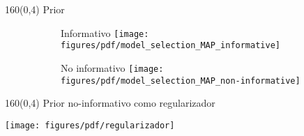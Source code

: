 \documentclass[shownotes,aspectratio=169]{beamer}
\begin{document}
% 
% 
% 
% 
% 
% 
% 
% 
% 
% 
% 
% 


\begin{frame}[plain]
\begin{textblock}{160}(0,4)
\centering \Large  Prior
\end{textblock}
\vspace{0.75cm}

       \begin{figure}[H]     
     \centering 
     \begin{subfigure}[b]{0.45\textwidth}
    \centering Informativo
    \texttt{[image: figures/pdf/model\_selection\_MAP\_informative]} 
     \end{subfigure}
       \begin{subfigure}[b]{0.45\textwidth}
     \centering 
     No informativo
    \texttt{[image: figures/pdf/model\_selection\_MAP\_non-informative]} 
   \end{subfigure}
\end{figure}

\end{frame}


\begin{frame}[plain]
\begin{textblock}{160}(0,4)
\centering \Large Prior no-informativo como regularizador
\end{textblock}
\vspace{0.75cm}

\centering
\texttt{[image: figures/pdf/regularizador]} 


\end{frame}
\end{document}
